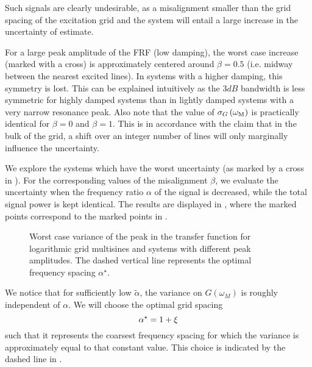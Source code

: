   Such signals are clearly undesirable, as a misalignment smaller than the grid spacing of the excitation grid and the system will entail a large increase in the uncertainty of estimate.
  
  For a large peak amplitude of the FRF (low damping), the worst case increase (marked with a cross) is approximately centered around $\beta = 0.5$ (i.e. midway between the nearest excited lines).
  In systems with a higher damping, this symmetry is lost.
  This can be explained intuitively as the $3\unit{dB}$ bandwidth is less symmetric for highly damped systems than in lightly damped systems with a very narrow resonance peak.
  Also note that the value of $\sigma_G\left(\omega_{\mathrm{M}} \right)$ is practically identical for $\beta=0$ and $\beta=1$.
  This is in accordance with the claim that in the bulk of the grid, a shift over an integer number of lines will only marginally influence the uncertainty.
  
  We explore the systems which have the worst uncertainty (as marked by a cross in ).
  For the corresponding values of the misalignment $\beta$, we evaluate the uncertainty when the frequency ratio $\alpha$ of the signal is decreased, while the total signal power is kept identical.
  The results are displayed in , where the marked points correspond to the marked points in .
  
  \begin{figure}[ht]
    \centering
      \setlength\figureheight{5cm}
      \setlength{}
    
    \caption[Worst-case variance $\sigma_G^2\left( \wM \right)$ as a function of the frequency ratio $\alpha$.]{Worst case variance of the peak in the transfer function for logarithmic
             grid multisines and systems with different peak amplitudes.
             The dashed vertical line represents the optimal frequency spacing $\alpha^{\star}$.}
    \label{fig:worstCaseAlpha}
  \end{figure}

  We notice that for sufficiently low $\tilde{\alpha}$, the variance on $G\left( \omega_M \right)$ is roughly independent of $\alpha$.
  We will choose the optimal grid spacing
  \begin{equation}
    \alpha^{\star} = 1 + \xi
    \label{eq:optimAlpha}
  \end{equation}
  such that it represents the coarsest frequency spacing for which the variance is approximately equal to that constant value.
  This choice is indicated by the dashed line in .

